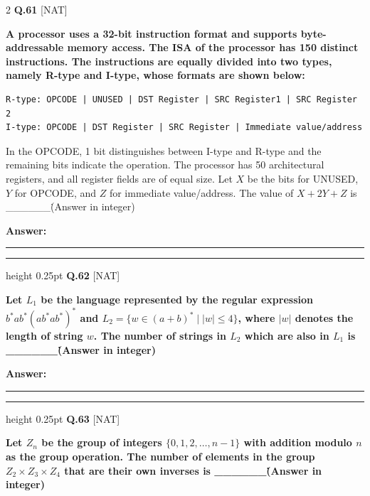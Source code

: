 \documentclass[a4paper,10pt,twoside]{article}
\begin{document}
\begin{multicols}{2}
\noindent\textbf{Q.61} \hfill {\footnotesize\textsf{[NAT]}}
\par\vspace{2pt}
{\bfseries A processor uses a 32-bit instruction format and supports byte-addressable memory access. The ISA of the processor has 150 distinct instructions. The instructions are equally divided into two types, namely R-type and I-type, whose formats are shown below:
\begin{verbatim}
R-type: OPCODE | UNUSED | DST Register | SRC Register1 | SRC Register 2
I-type: OPCODE | DST Register | SRC Register | Immediate value/address
\end{verbatim}
In the OPCODE, 1 bit distinguishes between I-type and R-type and the remaining bits indicate the operation. The processor has 50 architectural registers, and all register fields are of equal size.
Let $X$ be the bits for UNUSED, $Y$ for OPCODE, and $Z$ for immediate value/address. The value of $X + 2Y + Z$ is \_\_\_\_\_\_\. (Answer in integer) \par}
\par\vspace{3pt}\noindent\textbf{Answer:} \rule{3.2cm}{0.4pt}
\par\vspace{6pt}\hrule height 0.25pt\vspace{6pt}
\noindent\textbf{Q.62} \hfill {\footnotesize\textsf{[NAT]}}
\par\vspace{2pt}
{\bfseries Let $L_1$ be the language represented by the regular expression $b^* a b^* (a b^* a b^*)^*$ and $L_2 = \{ w \in (a + b)^* \mid |w| \le 4 \}$, where $|w|$ denotes the length of string $w$. The number of strings in $L_2$ which are also in $L_1$ is \_\_\_\_\_\_\. (Answer in integer) \par}
\par\vspace{3pt}\noindent\textbf{Answer:} \rule{3.2cm}{0.4pt}
\par\vspace{6pt}\hrule height 0.25pt\vspace{6pt}
\noindent\textbf{Q.63} \hfill {\footnotesize\textsf{[NAT]}}
\par\vspace{2pt}
{\bfseries Let $Z_n$ be the group of integers $\{0, 1, 2, \dots, n-1\}$ with addition modulo $n$ as the group operation. The number of elements in the group $Z_2 \times Z_3 \times Z_4$ that are their own inverses is \_\_\_\_\_\_\. (Answer in integer) \par}

\end{multicols}
\end{document}
